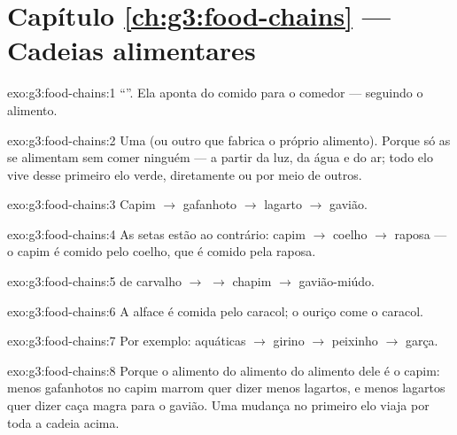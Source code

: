 \section*{Capítulo \ref{ch:g3:food-chains} --- Cadeias alimentares}

\begin{solution}{exo:g3:food-chains:1}
``''. Ela aponta do comido para o comedor --- seguindo o
alimento.
\end{solution}

\begin{solution}{exo:g3:food-chains:2}
Uma  (ou outro  que fabrica o próprio alimento).
Porque só as  se alimentam sem comer ninguém --- a partir da
luz, da água e do ar; todo elo  vive desse primeiro elo verde,
diretamente ou por meio de outros.
\end{solution}

\begin{solution}{exo:g3:food-chains:3}
Capim $\rightarrow$ gafanhoto $\rightarrow$ lagarto $\rightarrow$
gavião.
\end{solution}

\begin{solution}{exo:g3:food-chains:4}
As setas estão ao contrário: capim $\rightarrow$ coelho
$\rightarrow$ raposa --- o capim é comido pelo coelho, que é comido
pela raposa.
\end{solution}

\begin{solution}{exo:g3:food-chains:5}
 de carvalho $\rightarrow$  $\rightarrow$ chapim
$\rightarrow$ gavião-miúdo.
\end{solution}

\begin{solution}{exo:g3:food-chains:6}
A alface é comida pelo caracol; o ouriço come o caracol.
\end{solution}

\begin{solution}{exo:g3:food-chains:7}
Por exemplo:  aquáticas $\rightarrow$ girino $\rightarrow$
peixinho $\rightarrow$ garça.
\end{solution}

\begin{solution}{exo:g3:food-chains:8}
Porque o alimento do alimento do alimento dele é o capim: menos
gafanhotos no capim marrom quer dizer menos lagartos, e menos
lagartos quer dizer caça magra para o gavião. Uma mudança no
primeiro elo viaja por toda a cadeia acima.
\end{solution}

